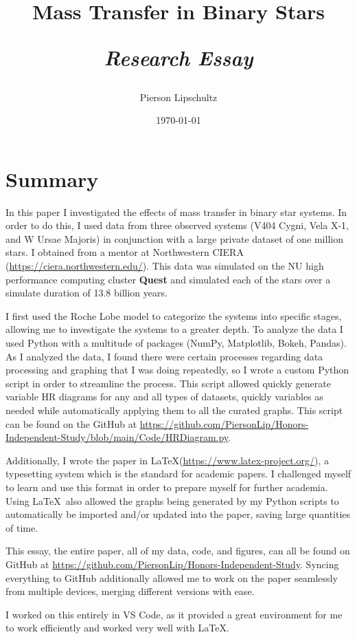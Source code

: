 \documentclass[12pt, a4paper]{article}
\title{Mass Transfer in Binary Stars 

\textit{Research Essay}}
\author{Pierson Lipschultz}
\begin{document}
\date{\today}
\maketitle
\section{Summary}
    In this paper I investigated the effects of mass transfer in binary star systems. In order to do this,  I used data from three observed systems (V404 Cygni, Vela X-1, and W Ursae Majoris) in conjunction with a large private dataset of one million stars. I obtained from a mentor at Northwestern CIERA (\url{https://ciera.northwestern.edu/}). This data was simulated on the NU high performance computing cluster \textbf{Quest} and simulated each of the stars over a simulate duration of 13.8 billion years.

    I first used the Roche Lobe model to categorize the systems into specific stages, allowing me to investigate the systems to a greater depth. To analyze the data I used Python with a multitude of packages (NumPy, Matplotlib, Bokeh, Pandas). As I analyzed the data, I found there were certain processes regarding data processing and graphing that I was doing repeatedly, so I wrote a custom Python script in order to streamline the process. This script allowed quickly generate variable HR diagrams for any and all types of datasets, quickly variables as needed while automatically applying them to all the curated graphs. This script can be found on the GitHub at \url{https://github.com/PiersonLip/Honors-Independent-Study/blob/main/Code/HRDiagram.py}.

	Additionally, I wrote the paper in \LaTeX (\url{https://www.latex-project.org/}), a typesetting system which is the standard for academic papers. I challenged myself to learn and use this format in order to prepare myself for further academia. Using \LaTeX ~also allowed the graphs being generated by my Python scripts to automatically be imported and/or updated into the paper, saving large quantities of time.

	This essay, the entire paper, all of my data, code, and figures, can all be found on GitHub at \url{https://github.com/PiersonLip/Honors-Independent-Study}. Syncing everything to GitHub additionally allowed me to work on the paper seamlessly from multiple devices, merging different versions with ease. 

    I worked on this entirely in VS Code, as it provided a great environment for me to work efficiently and worked very well with \LaTeX.
\end{document}
